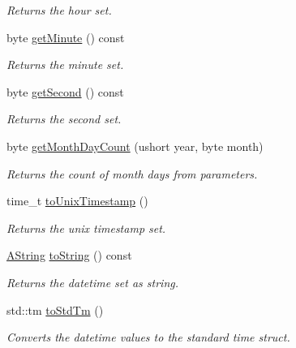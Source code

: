 \begin{DoxyCompactItemize}
\begin{DoxyCompactList}\small\item\em Returns the hour set. \end{DoxyCompactList}\item 
byte \mbox{\hyperlink{class_date_time_afcecea2d24e906df99b9105c116262b3}{get\+Minute}} () const
\begin{DoxyCompactList}\small\item\em Returns the minute set. \end{DoxyCompactList}\item 
byte \mbox{\hyperlink{class_date_time_a16d1e909db200146199b6623fce55a81}{get\+Second}} () const
\begin{DoxyCompactList}\small\item\em Returns the second set. \end{DoxyCompactList}\item 
byte \mbox{\hyperlink{class_date_time_a88fcd4dec4b3d77e9abdbc2bb81ed18a}{get\+Month\+Day\+Count}} (ushort year, byte month)
\begin{DoxyCompactList}\small\item\em Returns the count of month days from parameters. \end{DoxyCompactList}\item 
time\+\_\+t \mbox{\hyperlink{class_date_time_aae25042a72973b5192469bb84f08857a}{to\+Unix\+Timestamp}} ()
\begin{DoxyCompactList}\small\item\em Returns the unix timestamp set. \end{DoxyCompactList}\item 
\mbox{\hyperlink{class_a_string}{A\+String}} \mbox{\hyperlink{class_date_time_a26824c34470bf04d3ee6343c4ec872d8}{to\+String}} () const
\begin{DoxyCompactList}\small\item\em Returns the datetime set as string. \end{DoxyCompactList}\item 
std\+::tm \mbox{\hyperlink{class_date_time_a69f433ebbc09ac4c201ca8c2ea6e5015}{to\+Std\+Tm}} ()
\begin{DoxyCompactList}\small\item\em Converts the datetime values to the standard time struct. \end{DoxyCompactList}\end{DoxyCompactItemize}
